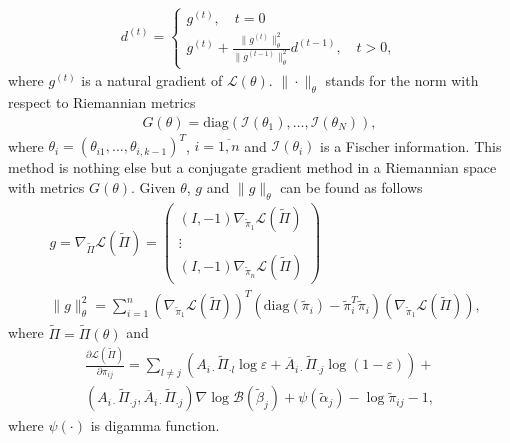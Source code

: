 \begin{equation}
    \begin{aligned}
    \label{d}
    d^{(t)} =
    \begin{cases}
        g^{(t)}, \quad t = 0 \\
        g^{(t)} + \frac{\| g^{(t)} \|_\theta^2}{\| g^{(t-1)} \|_\theta^2} d^{(t-1)}, \quad t > 0,
    \end{cases}
    \end{aligned}
\end{equation}
where $g^{(t)}$ is a natural gradient of $\mathcal L(\theta)$.
$\| \cdot \|_\theta$ stands for the norm with respect to Riemannian metrics
\begin{equation}
    \begin{aligned}
    \nonumber
    G(\theta) = \text{diag} \left( \mathcal I(\theta_1), \dots, \mathcal I(\theta_N) \right),
    \end{aligned}
\end{equation}
where $\theta_i = (\theta_{i1}, \dots, \theta_{i,k-1})^T$, $i = \overline{1, n}$ and $\mathcal I(\theta_i)$ is a Fischer information.
This method is nothing else but a conjugate gradient method in a Riemannian space with metrics $G(\theta)$.
Given $\theta$, $g$ and $\|g\|_\theta$ can be found as follows
\begin{equation}
    \begin{aligned}
    \label{ng}
    & g = \nabla_{\tilde\Pi} \mathcal L(\tilde\Pi) =
    \begin{pmatrix}
        (I, -1) \nabla_{\tilde\pi_1} \mathcal L(\tilde\Pi) \\
        \vdots \\
        (I, -1) \nabla_{\tilde\pi_n} \mathcal L(\tilde\Pi)
    \end{pmatrix} \\
    & \| g \|_\theta^2 = \sum\limits_{i = 1}^n \left( \nabla_{\tilde\pi_1} \mathcal L(\tilde\Pi) \right)^T \left( \text{diag}(\tilde\pi_i) - \tilde\pi_i^T \tilde\pi_i \right) \left( \nabla_{\tilde\pi_1} \mathcal L(\tilde\Pi) \right),
    \end{aligned}
\end{equation}
where $\tilde\Pi = \tilde\Pi(\theta)$
and
\begin{multline}
    \label{L_prime}
    \frac{\partial \mathcal L(\tilde\Pi)}{\partial \pi_{ij}} = \sum\limits_{l \neq j} \left( A_{i\cdot}\tilde\Pi_{\cdot l} \log\varepsilon + \overline A_{i\cdot}\tilde\Pi_{\cdot j} \log(1 - \varepsilon) \right) + \\
    \left( A_{i\cdot}\tilde\Pi_{\cdot j}, \overline A_{i\cdot}\tilde\Pi_{\cdot j} \right) \nabla\log\mathcal B (\tilde\beta_{j}) + \psi(\tilde\alpha_j) - \log\tilde\pi_{ij} - 1,
\end{multline}
where $\psi(\cdot)$ is digamma function.

